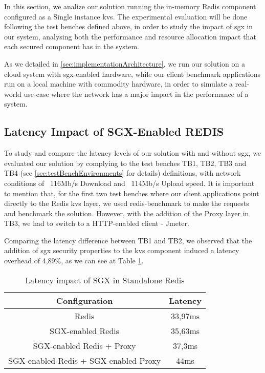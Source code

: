 In this section, we analize our solution running the in-memory Redis component configured as a Single instance \gls{kvs}. The experimental evaluation will be done following the test benches defined above, in order to study the impact of \gls{sgx} in our system, analysing both the performance and resource allocation impact that each secured component has in the system.

As we detailed in \ref{sec:implementationArchitecture}, we run our solution on a cloud system with \gls{sgx}-enabled hardware, while our client benchmark applications run on a local machine with commodity hardware, in order to simulate a real-world use-case where the network has a major impact in the performance of a system.

\subsection{Latency Impact of SGX-Enabled REDIS}

To study and compare the latency levels of our solution with and without \gls{sgx}, we evaluated our solution by complying to the test benches TB1, TB2, TB3 and TB4 (see \ref{sec:testBenchEnvironments} for details) definitions, with network conditions of ~116Mb/s Download and ~114Mb/s Upload speed. It is important to mention that, for the first two test benches where our client applications point directly to the Redis \gls{kvs} layer, we used redis-benchmark to make the requests and benchmark the solution. However, with the addition of the Proxy layer in TB3, we had to switch to a HTTP-enabled client - Jmeter.

Comparing the latency difference between TB1 and TB2, we observed that the addition of \gls{sgx} security properties to the \gls{kvs} component induced a latency overhead of 4,89\%, as we can see at Table  \ref{table:latencySingleRedis}.


\begin{table}[ht]
	\caption{Latency impact of SGX in Standalone Redis} %
	\centering %
	\begin{tabular}{c c} %
		\hline\hline %
		\textbf{Configuration} & \textbf{Latency} \\ [0.5ex] %
		\hline
		Redis & 33,97ms\\
		\hline
		SGX-enabled Redis & 35,63ms \\
		\hline
	    SGX-enabled Redis + Proxy & 37,3ms \\
		\hline %
	    SGX-enabled Redis + SGX-enabled Proxy & 44ms\\ [1ex] %
		\hline %
	\end{tabular}
	\label{table:latencySingleRedis} %
\end{table}

